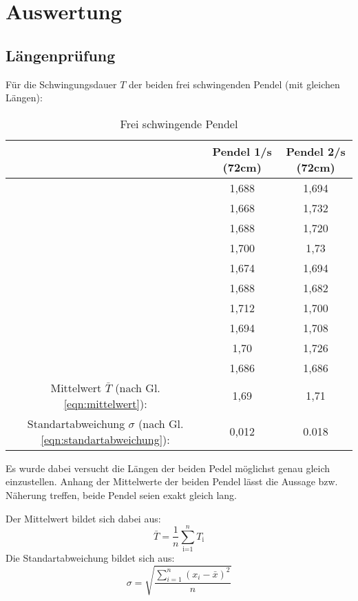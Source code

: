 \newpage
\section{Auswertung}
\label{sec:Auswertung}
\subsection{Längenprüfung}
Für die Schwingungsdauer $T$ der beiden frei schwingenden Pendel (mit gleichen Längen):

\begin{table}
    \centering
    \label{tab:Data_freischwingend}
    \begin{tabular}{c c | c}
        \toprule
         & Pendel 1\;/\;s (72cm) & Pendel 2\;/\;s (72cm)\\
        \midrule
        & 1,688 & 1,694 \\
        & 1,668 & 1,732 \\
        & 1,688 & 1,720  \\
        & 1,700  & 1,73  \\
        & 1,674 & 1,694 \\
        & 1,688 & 1,682 \\
        & 1,712 & 1,700   \\
        & 1,694 & 1,708 \\
        & 1,70  & 1,726 \\
        & 1,686 & 1,686 \\
        \midrule
        Mittelwert $\bar{T}$ (nach Gl. \ref{eqn:mittelwert}): & 1,69 & 1,71 \\
        Standartabweichung $\sigma$ (nach Gl. \ref{eqn:standartabweichung}): & 0,012 & 0.018 \\ 
        \bottomrule
    \end{tabular} 
    \caption{Frei schwingende Pendel}
\end{table}

Es wurde dabei versucht die Längen der beiden Pedel möglichst genau gleich einzustellen.
Anhang der Mittelwerte der beiden Pendel lässt die Aussage bzw. Näherung treffen, beide Pendel seien exakt gleich lang.

Der Mittelwert bildet sich dabei aus:
\begin{equation}
    \bar{T}=\frac{1}{n}\sum_{\textrm{i=1}}^n T_\textrm{i}
    \label{eqn:mittelwert}
\end{equation}
Die Standartabweichung bildet sich aus:
\begin{equation}
    \sigma = \sqrt{\frac{\sum_{i=1}^{n}(x_i-\bar{x})^2}{n}}
    \label{eqn:standartabweichung}
\end{equation}
\newpage
